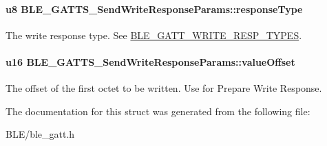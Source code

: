 \paragraph[{\texorpdfstring{response\+Type}{responseType}}]{\setlength{\rightskip}{0pt plus 5cm}u8 B\+L\+E\+\_\+\+G\+A\+T\+T\+S\+\_\+\+Send\+Write\+Response\+Params\+::response\+Type}\hypertarget{struct_b_l_e___g_a_t_t_s___send_write_response_params_a672993b34e4dc4f5ec3b90819792d933}{}\label{struct_b_l_e___g_a_t_t_s___send_write_response_params_a672993b34e4dc4f5ec3b90819792d933}
The write response type. See \hyperlink{group___b_l_e___g_a_t_t___w_r_i_t_e___r_e_s_p___t_y_p_e_s}{B\+L\+E\+\_\+\+G\+A\+T\+T\+\_\+\+W\+R\+I\+T\+E\+\_\+\+R\+E\+S\+P\+\_\+\+T\+Y\+P\+ES}. 
\paragraph[{\texorpdfstring{value\+Offset}{valueOffset}}]{\setlength{\rightskip}{0pt plus 5cm}u16 B\+L\+E\+\_\+\+G\+A\+T\+T\+S\+\_\+\+Send\+Write\+Response\+Params\+::value\+Offset}\hypertarget{struct_b_l_e___g_a_t_t_s___send_write_response_params_ac9ba88704ea2551282572e9a6e20f05a}{}\label{struct_b_l_e___g_a_t_t_s___send_write_response_params_ac9ba88704ea2551282572e9a6e20f05a}
The offset of the first octet to be written. Use for Prepare Write Response. 

The documentation for this struct was generated from the following file\+:\begin{DoxyCompactItemize}
\item 
B\+L\+E/ble\+\_\+gatt.\+h\end{DoxyCompactItemize}

